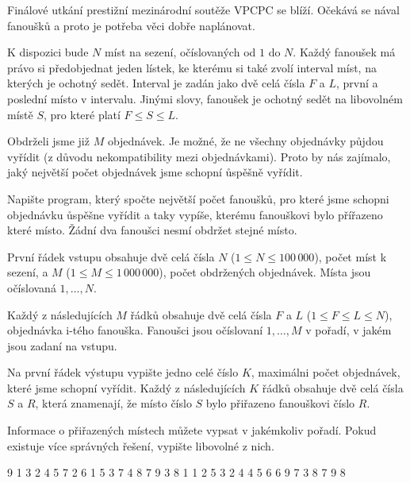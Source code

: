 





Finálové utkání prestižní mezinárodní soutěže VPCPC se blíží.
Očekává se nával fanoušků a proto je potřeba věci dobře naplánovat.

K dispozici bude $N$ míst na sezení, očíslovaných od $1$ do $N$.
Každý fanoušek má právo si předobjednat jeden lístek, ke kterému si také zvolí interval míst, na kterých je ochotný sedět.
Interval je zadán jako dvě celá čísla $F$ a $L$, první a poslední místo v intervalu.
Jinými slovy, fanoušek je ochotný sedět na libovolném místě $S$, pro které platí $F \leq S \leq L$.

Obdrželi jsme již $M$ objednávek.
Je možné, že ne všechny objednávky půjdou vyřídit (z důvodu nekompatibility mezi objednávkami).
Proto by nás zajímalo, jaký největší počet objednávek jsme schopní ůspěšně vyřídit.


Napište program, který spočte největší počet fanoušků, pro které jsme schopni objednávku ůspěšne vyřídit a taky vypíše, kterému fanouškovi bylo přířazeno které místo.
Žádní dva fanoušci nesmí obdržet stejné místo.


První řádek vstupu obsahuje dvě celá čísla $N$ ($1 \leq N \leq 100\,000$), počet míst k sezení, a $M$ ($1 \leq M \leq 1\,000\,000$), počet obdržených objednávek. Místa jsou očíslovaná $1,\ldots,N$.

Každý z následujících $M$ řádků obsahuje dvě celá čísla $F$ a $L$ ($1 \leq F \leq L \leq N$), objednávka i-tého fanouška.
Fanoušci jsou očíslovaní $1,\ldots,M$ v pořadí, v jakém jsou zadaní na vstupu.


Na první řádek výstupu vypište jedno celé číslo $K$, maximálni počet objednávek, které jsme schopní vyřídit.
Každý z následujících $K$ řádků obsahuje dvě celá čísla $S$ a $R$, která znamenají, že místo číslo $S$ bylo přiřazeno fanouškovi číslo $R$.

Informace o přiřazených místech můžete vypsat v jakémkoliv pořadí.
Pokud existuje více správných řešení, vypište libovolné z nich.

 9
1 3
2 4
5 7
2 6
1 5
3 7
4 8
7 9
3 8
1 1
2 5
3 2
4 4
5 6
6 9
7 3
8 7
9 8
\sampleCOMMENT

\sampleEND
\bigskip


